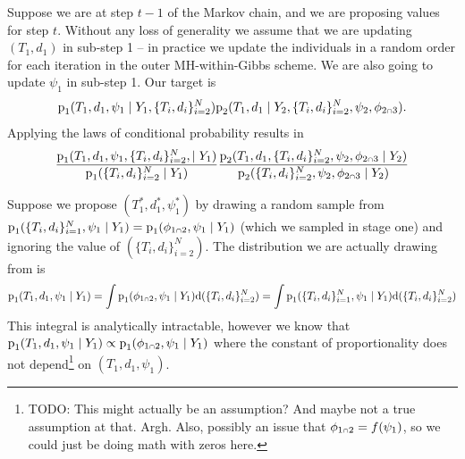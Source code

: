 \documentclass[
  10pt,
  a4paper,
]{article}
\let\Oldcap\cap
\renewcommand{\cap}{\mathrel{\mathsmaller{\Oldcap}}}
\newcommand{\pd}{\text{p}}
\begin{document}
Suppose we are at step \(t - 1\) of the Markov chain, and we are
proposing values for step \(t\). Without any loss of generality we
assume that we are updating \((T_{1}, d_{1})\) in sub-step 1 -- in
practice we update the individuals in a random order for each iteration
in the outer MH-within-Gibbs scheme. We are also going to update
\(\psi_{1}\) in sub-step 1. Our target is \begin{equation}
  \pd_{1}(T_{1}, d_{1}, \psi_{1} \mid Y_{1}, \{T_{i}, d_{i}\}_{i = 2}^{N})
  \pd_{2}(T_{1}, d_{1} \mid Y_{2}, \{T_{i}, d_{i}\}_{i = 2}^{N}, \psi_{2}, \phi_{2 \cap 3}).
\end{equation} Applying the laws of conditional probability results in
\begin{equation}
  \frac {
    \pd_{1}(T_{1}, d_{1}, \psi_{1}, \{T_{i}, d_{i}\}_{i = 2}^{N}, \mid Y_{1})
  } {
    \pd_{1}(\{T_{i}, d_{i}\}_{i = 2}^{N} \mid Y_{1})
  }
  \frac {
    \pd_{2}(T_{1}, d_{1}, \{T_{i}, d_{i}\}_{i = 2}^{N}, \psi_{2}, \phi_{2 \cap 3} \mid Y_{2})
  } {
    \pd_{2}(\{T_{i}, d_{i}\}_{i = 2}^{N}, \psi_{2}, \phi_{2 \cap 3} \mid Y_{2})
  }
  \label{eqn:sub-step-one-target}
\end{equation}

Suppose we propose \((T_{1}^{*}, d_{1}^{*}, \psi_{1}^{*})\) by drawing a
random sample from
\(\pd_{1}(\{T_{i}, d_{i}\}_{i = 1}^{N}, \psi_{1} \mid Y_{1}) = \pd_{1}(\phi_{1 \cap 2}, \psi_{1} \mid Y_{1})\)
(which we sampled in stage one) and ignoring the value of
\((\{T_{i}, d_{i}\}_{i = 2}^{N})\). The distribution we are actually
drawing from is \begin{equation}
  \pd_{1}(T_{1}, d_{1}, \psi_{1} \mid Y_{1})
  = \int \pd_{1}(\phi_{1 \cap 2}, \psi_{1} \mid Y_{1}) \text{d} (\{T_{i}, d_{i}\}_{i = 2}^{N})
  = \int \pd_{1}(\{T_{i}, d_{i}\}_{i = 1}^{N}, \psi_{1} \mid Y_{1}) \text{d} (\{T_{i}, d_{i}\}_{i = 2}^{N})
\end{equation} This integral is analytically intractable, however we
know that
\(\pd_{1}(T_{1}, d_{1}, \psi_{1} \mid Y_{1}) \propto \pd_{1}(\phi_{1 \cap 2}, \psi_{1} \mid Y_{1})\)
where the constant of proportionality does not depend\footnote{TODO:
  This might actually be an assumption? And maybe not a true assumption
  at that. Argh. Also, possibly an issue that
  \(\phi_{1 \cap 2} = f(\psi_{1})\), so we could just be doing math with
  zeros here.} on \((T_{1}, d_{1}, \psi_{1})\).
\end{document}

